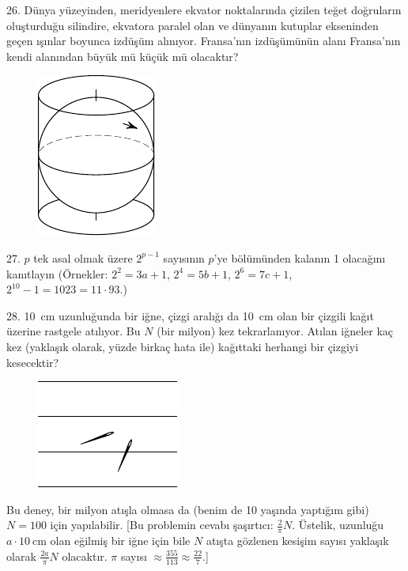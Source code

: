 \begin{problem}{26.}
	Dünya yüzeyinden, meridyenlere ekvator noktalarında çizilen teğet doğruların oluşturduğu silindire, ekvatora paralel olan ve dün\-ya\-nın kutuplar ekseninden geçen ışınlar boyunca izdüşüm alınıyor. Fran\-sa'nın izdüşümünün alanı Fransa'nın kendi alanından büyük mü küçük mü olacaktır?
	\begin{figure}
		\includegraphics{resources/taskbook-10}
	\end{figure}
\end{problem}

\begin{problem}{27.}
	$p$ tek asal olmak üzere $2^{p-1}$ sayısının $p$'ye bölümünden kalanın 1 olacağını kanıtlayın (Örnekler: $2^2 = 3a + 1$, $2^4 = 5b+1$, $2^6 = 7c+1$, $2^{10} - 1 = 1023 = 11\cdot 93$.)
\end{problem}

\begin{problem}{28.}
	\SI{10}{\cm} uzunluğunda bir iğne, çizgi aralığı da \SI{10}{\cm} olan bir çizgili kağıt üzerine rastgele atılıyor. Bu $N$ (bir milyon) kez tekrarlanıyor. Atılan iğneler kaç kez (yaklaşık olarak, yüzde birkaç hata ile) kağıttaki herhangi bir çizgiyi kesecektir?
	\begin{figure}
		\includegraphics{resources/taskbook-12}
	\end{figure}
Bu deney, bir milyon atışla olmasa da (benim de 10 yaşında yap\-tı\-ğım gibi) $N=100$ için yapılabilir. [Bu problemin cevabı şaşırtıcı: $\frac{2}{\pi}N$. Üstelik, uzunluğu $a \cdot \SI{10}{\cm}$ olan eğilmiş bir iğne için bile $N$ atışta gözlenen kesişim sayısı yaklaşık olarak $\frac{2a}{\pi}N$ olacaktır. $\pi$ sayısı $\approx \frac{355}{113}\approx \frac{22}{7}$.]
\end{problem}

